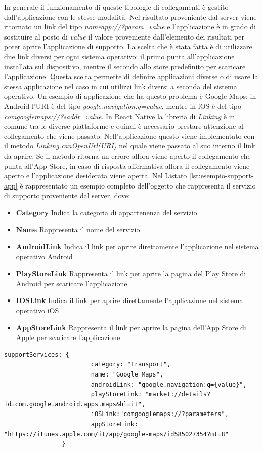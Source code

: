 In generale il funzionamento di queste tipologie di collegamenti è gestito dall'applicazione con le stesse modalità. Nel risultato proveniente dal server viene ritornato un link del tipo \emph{nomeapp://?param={value}} e l'applicazione è in grado di sostituire al posto di \emph{value} il valore proveniente dall'elemento dei risultati per poter aprire l'applicazione di supporto. La scelta che è stata fatta è di utilizzare due link diversi per ogni sistema operativo: il primo punta all'applicazione installata sul dispositivo, mentre il secondo allo store predefinito per scaricare l'applicazione. Questa scelta permette di definire applicazioni diverse o di usare la stessa applicazione nel caso in cui utilizzi link diversi a seconda del sistema operativo. Un esempio di applicazione che ha questo problema è Google Maps: in Android l'URI è del tipo \emph{google.navigation:q={value}}, mentre in iOS è del tipo \emph{comgooglemaps://?saddr={value}}. In React Native la libreria di \emph{Linking} è in comune tra le diverse piattaforme e quindi è necessario prestare attenzione al collegamento che viene passato. Nell'applicazione questo viene implementato con il metodo \emph{Linking.canOpenUrl(URI)} nel quale viene passato al suo interno il link da aprire. Se il metodo ritorna un errore allora viene aperto il collegamento che punta all'App Store, in caso di risposta affermativa allora il collegamento viene aperto e l'applicazione desiderata viene aperta. Nel Listato \ref{lst:esempio-support-app} è rappresentato un esempio completo dell'oggetto che rappresenta il servizio di supporto proveniente dal server, dove:
\begin{itemize}
	\item \textbf{Category} Indica la categoria di appartenenza del servizio
	\item \textbf{Name} Rappresenta il nome del servizio
	\item \textbf{AndroidLink} Indica il link per aprire direttamente l'applicazione nel sistema operativo Android
	\item \textbf{PlayStoreLink} Rappresenta il link per aprire la pagina del Play Store di Android per scaricare l'applicazione
	\item \textbf{IOSLink} Indica il link per aprire direttamente l'applicazione nel sistema operativo iOS
	\item \textbf{AppStoreLink} Rappresenta il link per aprire la pagina dell'App Store di Apple per scaricare l'applicazione
\end{itemize}

\begin{lstlisting}[backgroundcolor = \color{lightgray},
							caption = Esempio di risposta per i servizi di supporto,
							label = lst:esempio-support-app]
				supportServices: {
						category: "Transport",
						name: "Google Maps",
						androidLink: "google.navigation:q={value}",
						playStoreLink: "market://details?id=com.google.android.apps.maps&hl=it",
						iOSLink:"comgooglemaps://?parameters",
						appStoreLink: "https://itunes.apple.com/it/app/google-maps/id585027354?mt=8"						
				}
\end{lstlisting}